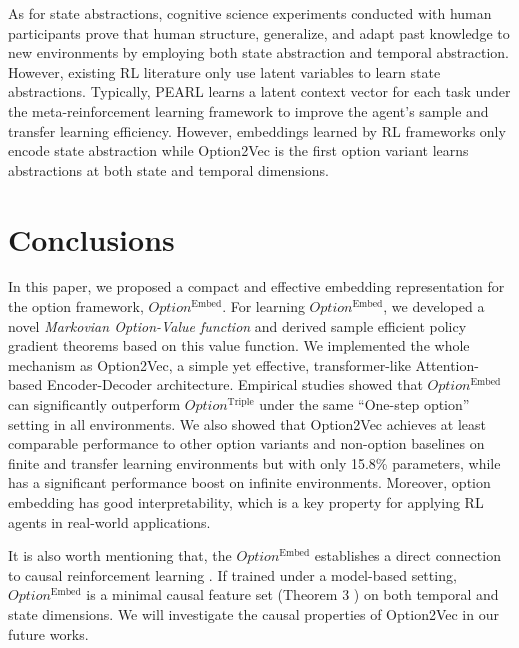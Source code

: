 \documentclass{article}
\begin{document}
As for state abstractions, cognitive science experiments
\cite{xia2020temporal} conducted with human participants prove
that human structure, generalize, and adapt past knowledge to new
environments by employing both state abstraction and temporal
abstraction. However, existing RL literature
\cite{hausman2018learning,li2017infogail,tirumala2019exploiting}
only use latent variables to learn state abstractions. Typically,
PEARL \cite{rakelly2019efficient} learns a latent context vector
for each task under the meta-reinforcement learning framework to
improve the agent's sample and transfer learning efficiency.
However, embeddings learned by RL frameworks only encode state
abstraction while Option2Vec is the first option variant learns
abstractions at both state and temporal dimensions.
\vspace{-4mm}\section{Conclusions}
\label{sec:conclusion}
\vspace{-2mm}
In this paper, we proposed a compact and effective embedding representation for the option framework, $Option^{\textrm{Embed}}$.
For learning $Option^{\textrm{Embed}}$, we developed a novel \emph{Markovian Option-Value function} and derived sample efficient policy gradient theorems based on this
value function. We implemented the whole mechanism as Option2Vec, a simple yet effective, transformer-like Attention-based Encoder-Decoder
architecture. Empirical studies showed that $Option^{\textrm{Embed}}$ can significantly outperform $Option^{\textrm{Triple}}$ under the same ``One-step option'' setting in all environments. We also showed that Option2Vec achieves at least comparable performance to other option variants and non-option baselines on finite and transfer learning environments but with only 15.8\% parameters, while has a significant performance boost on infinite environments.
Moreover, option embedding has good interpretability, which is a key property for applying RL agents in real-world applications.

It is also worth mentioning that, the $Option^{\textrm{Embed}}$
establishes a direct connection to causal reinforcement learning
\cite{kolobov2012discovering,perez2020generalized}. If trained
under a model-based setting, $Option^{\textrm{Embed}}$ is a minimal causal
feature set (Theorem 3 \cite{zhang2020learning}) on both temporal
and state dimensions. We will investigate the causal properties of Option2Vec in our future works.
\end{document}
